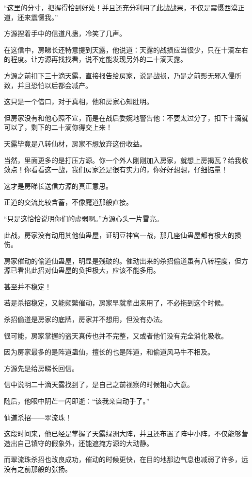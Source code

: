 \begin{this_body}
“这里的分寸，把握得恰到好处！并且还充分利用了此战战果，不仅是震慑西漠正道，还来震慑我。”

方源捏着手中的信道凡蛊，冷笑了几声。

在这信中，房睇长还特意提到天露，他说道：天露的战损应当很少，只在十滴左右的程度。让方源再找找看，说不定能发现另外的二十滴天露。

方源之前扣下三十滴天露，直接报告给房家，说是战损，乃是之前影无邪入侵所致，并且恐怕以后都会减产。

这只是一个借口，对于真相，他和房家心知肚明。

但房家没有和他心照不宣，而是在战后委婉地警告他：不要太过分了，扣下十滴就可以了，剩下的二十滴你得交上来！

天露毕竟是八转仙材，房家不想放弃这份收益。

当然，里面更多的是打压方源。你一个外人刚刚加入房家，就想上房揭瓦？给我收敛点！你看看这一战，我们房家还是很有实力的，你好好想想，仔细掂量！

这才是房睇长送信方源的真正意思。

正道的交流比较含蓄，不像魔道那般直接。

“只是这恰恰说明你们的虚弱啊。”方源心头一片雪亮。

此战，房家没有动用其他仙蛊屋，证明豆神宫一战，那几座仙蛊屋都有极大的损伤。

房家催动的偷道仙蛊屋，明显是残破的。催动出来的杀招偷道虽有八转程度，但方源已看出此招对仙蛊屋的负担极大，应该不能多用。

甚至并不稳定！

若是杀招稳定，又能频繁催动，房家早就拿出来用了，不必拖到这个时候。

杀招偷道是房家的底牌，房家并不想用，但没有办法。

很可能，房家掌握的盗天真传也并不完整，又或者他们没有完全消化吸收。

因为房家最多的是阵道蛊仙，擅长的也是阵道，和偷道风马牛不相及。

方源先是给房睇长回信。

信中说明二十滴天露找到了，是自己之前视察的时候粗心大意。

随后，他眼中阴芒一闪即逝：“该我亲自动手了。”

仙道杀招——翠流珠！

这段时间来，他已经是掌握了天露绿洲大阵，并且还布置了阵中小阵，不仅能够营造出自己镇守的假象外，还能遮掩方源的大动静。

而翠流珠杀招也改良成功，催动的时候更快，在目的地那边气息也减弱了许多，远没有之前那般的张扬。


\end{this_body}
